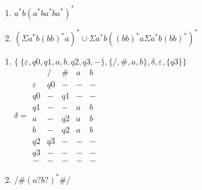 \documentclass[12pt]{article}
\newenvironment{problem}[2][Problem]{\begin{trivlist}
\item[\hskip \labelsep {\bfseries #1}\hskip \labelsep {\bfseries #2.}]}{\end{trivlist}}
\begin{document}
\begin{problem}{1.21}
\end{problem}
\begin{enumerate}
	\item[(a)]
		$a^*b(a^*ba^*ba^*)^*$
	\item[(b)]
		$(\Sigma a^*b(bb)^*a)^*\cup\Sigma a^*b((bb)^*a\Sigma a^*b(bb)^*)^*$
\end{enumerate}

\begin{problem}{1.22}
\end{problem}
\begin{enumerate}
	\item[(a)]
		$\{ \:\{\varepsilon, q0, q1, a, b, q2, q3, -\}, \{/, \#, a, b\}, \delta, \varepsilon, \{q3\}\}$	\\
		$\delta = 
		\begin{array}{ c|c|c|c|c }
			 & / & \# & a & b\\
			\hline
			\varepsilon  & q0 & - & - & -\\
			\hline
			q0 & - & q1 & - & -\\
			\hline
			q1 & - & - & a & b\\
			\hline
			a & - & q2 & a & b\\
			\hline
			b & - & q2 & a & b\\
			\hline
			q2 & q3 & - & - & -\\
			\hline
			q3 & - & - & - & -\\
			\hline
			- & - & - & - & -
		\end{array}$\\
		
	\item[(b)]
		$/\#(a?b?)^*\#/$
\end{enumerate}
\end{document}
